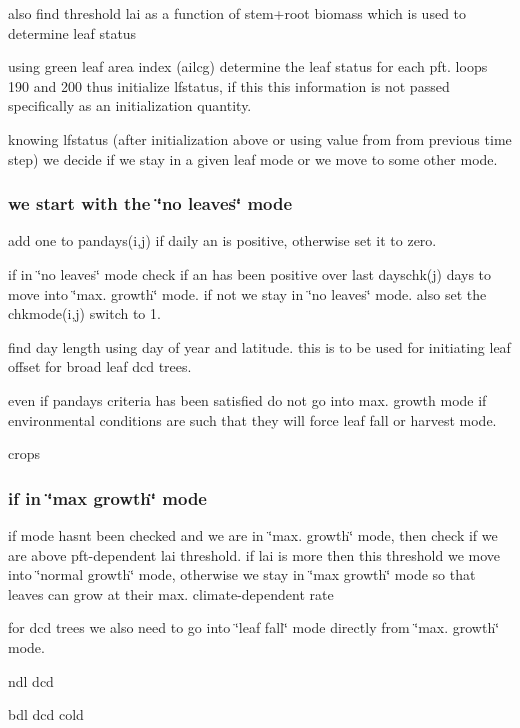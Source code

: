 also find threshold lai as a function of stem+root biomass which is used to determine leaf status

using green leaf area index (ailcg) determine the leaf status for each pft. loops 190 and 200 thus initialize lfstatus, if this this information is not passed specifically as an initialization quantity.

knowing lfstatus (after initialization above or using value from from previous time step) we decide if we stay in a given leaf mode or we move to some other mode.

\subsubsection*{we start with the \char`\"{}no leaves\char`\"{} mode }

add one to pandays(i,j) if daily an is positive, otherwise set it to zero.

if in \char`\"{}no leaves\char`\"{} mode check if an has been positive over last dayschk(j) days to move into \char`\"{}max. growth\char`\"{} mode. if not we stay in \char`\"{}no leaves\char`\"{} mode. also set the chkmode(i,j) switch to 1.

find day length using day of year and latitude. this is to be used for initiating leaf offset for broad leaf dcd trees.

even if pandays criteria has been satisfied do not go into max. growth mode if environmental conditions are such that they will force leaf fall or harvest mode.

crops

\subsubsection*{if in \char`\"{}max growth\char`\"{} mode }

if mode hasn\textquotesingle{}t been checked and we are in \char`\"{}max. growth\char`\"{} mode, then check if we are above pft-\/dependent lai threshold. if lai is more then this threshold we move into \char`\"{}normal growth\char`\"{} mode, otherwise we stay in \char`\"{}max growth\char`\"{} mode so that leaves can grow at their max. climate-\/dependent rate

for dcd trees we also need to go into \char`\"{}leaf fall\char`\"{} mode directly from \char`\"{}max. growth\char`\"{} mode.

ndl dcd

bdl dcd cold

